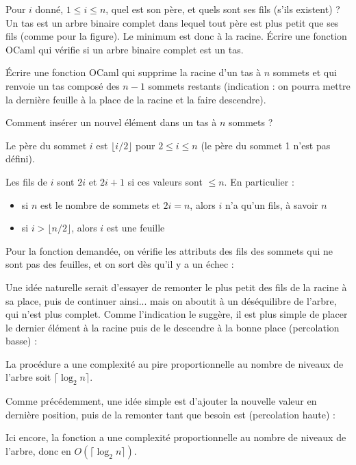 \Q
Pour $i$ donné, $1 \leq i \leq n$, quel est son père, et quels sont ses fils (s'ils existent) ? Un tas est un arbre binaire complet dans lequel tout père est plus petit que ses fils (comme pour la figure). Le minimum est donc à la racine. Écrire une fonction OCaml qui vérifie si un arbre binaire complet est un tas.

\Q
Écrire une fonction OCaml qui supprime la racine d'un tas à $n$ sommets et qui renvoie un tas composé des $n-1$ sommets restants (indication : on pourra mettre la dernière feuille à la place de la racine et la faire descendre).

\Q
Comment insérer un nouvel élément dans un tas à $n$ sommets ?

\Corrige

\Q
Le père du sommet $i$ est $\lfloor i/2 \rfloor$ pour $2 \leq i \leq n$ (le père du sommet 1 n'est pas défini).
\smallskip

Les fils de $i$ sont $2i$ et $2i+1$ si ces valeurs sont $\leq n$. En particulier :
\begin{itemize}
    \item si $n$ est le nombre de sommets et $2i=n$, alors $i$ n'a qu'un fils, à savoir $n$
    \item si $i>\lfloor n/2 \rfloor$, alors $i$ est une feuille
\end{itemize}
Pour la fonction demandée, on vérifie les attributs des fils des sommets qui ne sont pas des feuilles, et on sort dès qu'il y a un échec :



\Q
Une idée naturelle serait d'essayer de remonter le plus petit des fils de la racine à sa place, puis de continuer ainsi... mais on aboutit à un déséquilibre de l'arbre, qui n'est plus complet. Comme l'indication le suggère, il est plus simple de placer le dernier élément à la racine puis de le descendre à la bonne place (percolation basse) :



La procédure a une complexité au pire proportionnelle au nombre de niveaux de l'arbre soit $\lceil \log_2n\rceil$.

\Q
Comme précédemment, une idée simple est d'ajouter la nouvelle valeur en dernière position, puis de la remonter tant que besoin est (percolation haute) :



Ici encore, la fonction a une complexité proportionnelle au nombre de niveaux de l'arbre, donc en $O(\lceil \log_2n \rceil)$.
\medskip

